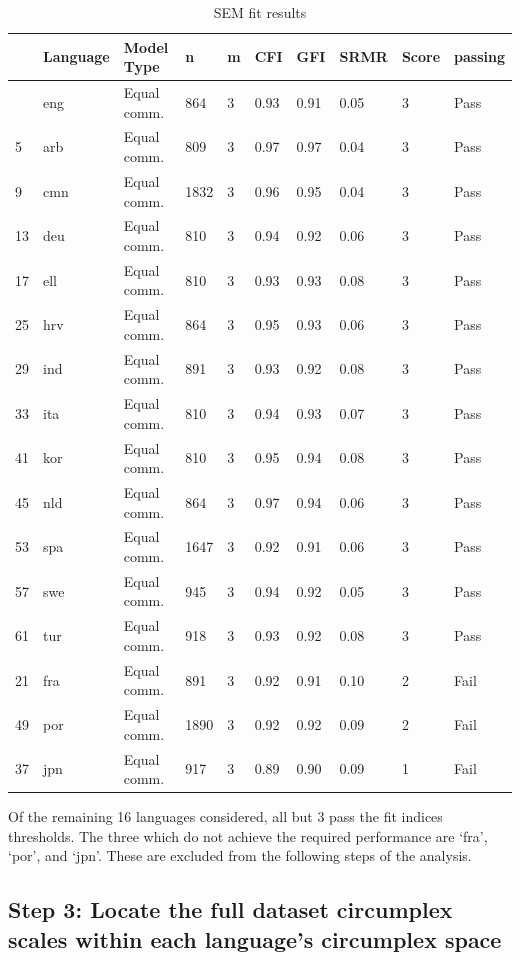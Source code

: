 \documentclass[
  authoryear,
  preprint,
  3p]{elsarticle}
\begin{document}
\begin{longtable}[]{@{}llllllllll@{}}

\caption{\label{tbl-sem-res}SEM fit results}

\tabularnewline

\toprule\noalign{}
& Language & Model Type & n & m & CFI & GFI & SRMR & Score & passing \\
\midrule\noalign{}
\endhead
\bottomrule\noalign{}
\endlastfoot
1 & eng & Equal comm. & 864 & 3 & 0.93 & 0.91 & 0.05 & 3 & Pass \\
5 & arb & Equal comm. & 809 & 3 & 0.97 & 0.97 & 0.04 & 3 & Pass \\
9 & cmn & Equal comm. & 1832 & 3 & 0.96 & 0.95 & 0.04 & 3 & Pass \\
13 & deu & Equal comm. & 810 & 3 & 0.94 & 0.92 & 0.06 & 3 & Pass \\
17 & ell & Equal comm. & 810 & 3 & 0.93 & 0.93 & 0.08 & 3 & Pass \\
25 & hrv & Equal comm. & 864 & 3 & 0.95 & 0.93 & 0.06 & 3 & Pass \\
29 & ind & Equal comm. & 891 & 3 & 0.93 & 0.92 & 0.08 & 3 & Pass \\
33 & ita & Equal comm. & 810 & 3 & 0.94 & 0.93 & 0.07 & 3 & Pass \\
41 & kor & Equal comm. & 810 & 3 & 0.95 & 0.94 & 0.08 & 3 & Pass \\
45 & nld & Equal comm. & 864 & 3 & 0.97 & 0.94 & 0.06 & 3 & Pass \\
53 & spa & Equal comm. & 1647 & 3 & 0.92 & 0.91 & 0.06 & 3 & Pass \\
57 & swe & Equal comm. & 945 & 3 & 0.94 & 0.92 & 0.05 & 3 & Pass \\
61 & tur & Equal comm. & 918 & 3 & 0.93 & 0.92 & 0.08 & 3 & Pass \\
21 & fra & Equal comm. & 891 & 3 & 0.92 & 0.91 & 0.10 & 2 & Fail \\
49 & por & Equal comm. & 1890 & 3 & 0.92 & 0.92 & 0.09 & 2 & Fail \\
37 & jpn & Equal comm. & 917 & 3 & 0.89 & 0.90 & 0.09 & 1 & Fail \\

\end{longtable}

Of the remaining 16 languages considered, all but 3 pass the fit indices
thresholds. The three which do not achieve the required performance are
`fra', `por', and `jpn'. These are excluded from the following steps of
the analysis.

\subsection{Step 3: Locate the full dataset circumplex scales within
each language's circumplex
space}\label{step-3-locate-the-full-dataset-circumplex-scales-within-each-languages-circumplex-space-1}
\end{document}
